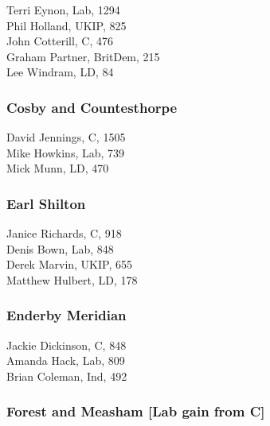 \documentclass[a4paper,openany,10pt]{book}
\begin{document}
Terri Eynon, Lab, 1294\\
Phil Holland, UKIP, 825\\
John Cotterill, C, 476\\
Graham Partner, BritDem, 215\\
Lee Windram, LD, 84\\


\subsubsection*{Cosby and Countesthorpe}



David Jennings, C, 1505\\
Mike Howkins, Lab, 739\\
Mick Munn, LD, 470\\


\subsubsection*{Earl Shilton}



Janice Richards, C, 918\\
Denis Bown, Lab, 848\\
Derek Marvin, UKIP, 655\\
Matthew Hulbert, LD, 178\\


\subsubsection*{Enderby Meridian}



Jackie Dickinson, C, 848\\
Amanda Hack, Lab, 809\\
Brian Coleman, Ind, 492\\


\subsubsection*{Forest and Measham \hspace*{\fill}\nolinebreak[1]%
\enspace\hspace*{\fill}
[Lab gain from C]}
\end{document}

